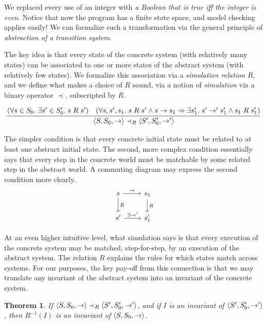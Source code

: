 \documentclass{amsbook}
\newtheorem{theorem}{Theorem}[chapter]
\theoremstyle{definition}
\theoremstyle{remark}
\numberwithin{section}{chapter}
\numberwithin{equation}{chapter}
\begin{document}
We replaced every use of an integer with \emph{a Boolean that is true iff the integer is even}.
Notice that now the program has a finite state space, and model checking applies easily!
We can formalize such a transformation via the general principle of \emph{abstraction of a transition system}.

\newcommand{\simulate}[0]{\prec}

The key idea is that every state of the concrete system (with relatively many states) can be associated to one or more states of the abstract system (with relatively few states).
We formalize this association via a \emph{simulation relation} $R$, and we define what makes a choice of $R$ sound, via a notion of \emph{simulation} via a binary operator $\simulate$, subscripted by $R$.

$$\infer{\angled{S, S_0, \to} \simulate_R \angled{S', S'_0, \to'}}{
  (\forall s \in S_0. \; \exists s' \in S'_0. \; s \; R \; s')
  & (\forall s, s', s_1. \; s \; R \; s' \land s \to s_1 \Rightarrow \exists s'_1. \; s' \to' s'_1 \land s_1 \; R \; s'_1)
}$$

The simpler condition is that every concrete initial state must be related to at least one abstract initial state.
The second, more complex condition essentially says that every step in the concrete world must be matchable by some related step in the abstract world.
A commuting diagram may express the second condition more clearly.
\[
\begin{tikzcd}
s \arrow{r}{\to} \arrow{d}{R} & s_1 \arrow{d}{R} \\
s' \arrow{r}{\exists \to'} & s'_1
\end{tikzcd}
\]

At an even higher intuitive level, what simulation says is that every execution of the concrete system may be matched, step-for-step, by an execution of the abstract system.
The relation $R$ explains the rules for which states match across systems.
For our purposes, the key pay-off from this connection is that we may translate any invariant of the abstract system into an invariant of the concrete system.

\newcommand{\abstraction}[0]{}

\begin{theorem}\label{abstract_simulation}
  \abstraction
  If $\angled{S, S_0, \to} \simulate_R \angled{S', S'_0, \to'}$, and if $I$ is an invariant of ${\left \langle S', S'_0, \to' \right \rangle}$, then $R^{-1}(I)$ is an invariant of ${\left \langle S, S_0, \to \right \rangle}$.
\end{theorem}
\end{document}
